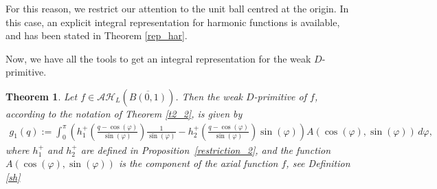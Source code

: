 \documentclass[reqno,11pt]{amsart}
\numberwithin{equation}{section}
\newtheorem{theorem}{Theorem}[section]
\theoremstyle{definition}
\begin{document}
For this reason, we restrict our attention to the unit ball centred at the origin. In this case, an explicit integral representation for harmonic functions is available, and has been stated in Theorem \ref{rep_har}.




Now, we have all the tools to get an integral representation for the weak $D$-primitive.

\begin{theorem}\label{harmonic_primitive}
	Let $f \in \mathcal{AH}_L(\overline{B(0,1)})$. Then the weak $D$-primitive of $f$, according to the notation of Theorem \ref{t2_2}, is given by
	\begin{align*}
		g_1(q):=\int_0^\pi \left( h_1^+\!\left(\frac{q-\cos(\varphi)}{\sin(\varphi)} \right)\frac{1}{\sin(\varphi)}- h_2^+\!\left(\frac{q-\cos(\varphi)}{\sin(\varphi)} \right) \sin(\varphi)  \right) A(\cos(\varphi),\sin(\varphi))\, d\varphi,
	\end{align*}
	where $h_1^+$ and $h_2^+$ are defined in Proposition~\ref{restriction_2}, and the function $A(\cos(\varphi),\sin(\varphi))$ is the component of the axial function $f$, see Definition \ref{sh}
\end{theorem}
\end{document}
